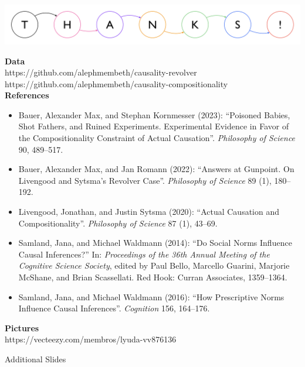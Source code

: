 \documentclass[xcolor=table,9pt,aspectratio=169]{beamer}
\begin{document}
\begin{frame}{}
\begin{center}
   {\includegraphics[width=0.9\linewidth]{figures/thanks.pdf}}
\end{center}
{\footnotesize
\textbf{Data}\\
https://github.com/alephmembeth/causality-revolver\\
https://github.com/alephmembeth/causality-compositionality\\
\vspace{0.5em}
\textbf{References}\\
\vspace{-0.5em}
\begin{itemize}[label=,leftmargin=2em,itemindent=-2em]
   \item Bauer, Alexander Max, and Stephan Kornmesser (2023): ``Poisoned Babies, Shot Fathers, and Ruined Experiments. Experimental Evidence in Favor of the Compositionality Constraint of Actual Causation''. \textit{Philosophy of Science} 90, 489--517.
   \item Bauer, Alexander Max, and Jan Romann (2022): ``Answers at Gunpoint. On Livengood and Sytsma's Revolver Case''. \textit{Philosophy of Science} 89 (1), 180--192.
   \item Livengood, Jonathan, and Justin Sytsma (2020): ``Actual Causation and Compositionality''. \textit{Philosophy of Science} 87 (1), 43--69.
   \item Samland, Jana, and Michael Waldmann (2014): ``Do Social Norms Influence Causal Inferences?'' In: \textit{Proceedings of the 36th Annual Meeting of the Cognitive Science Society}, edited by Paul Bello, Marcello Guarini, Marjorie McShane, and Brian Scassellati. Red Hook: Curran Associates, 1359--1364.
   \item Samland, Jana, and Michael Waldmann (2016): ``How Prescriptive Norms Influence Causal Inferences''. \textit{Cognition} 156, 164--176.
\end{itemize}
\textbf{Pictures}\\
https://vecteezy.com/membros/lyuda-vv876136\\
}
\end{frame}


\begin{frame}
\begin{overlayarea}{\textwidth}{0.81\paperheight}{
   \vspace*{11mm}
   \textcolor{uolblue}
   {\hspace*{1em}Additional Slides}
}
\end{overlayarea}
\end{frame}
\end{document}
